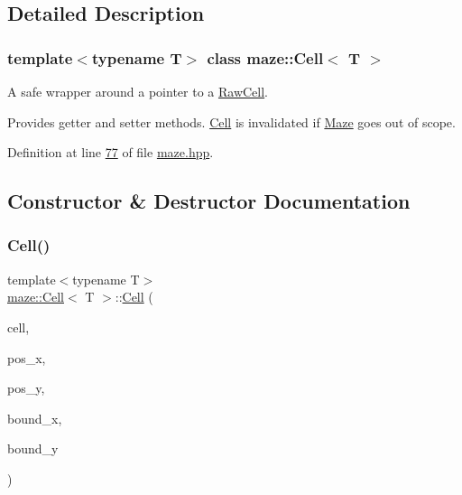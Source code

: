 \subsection{Detailed Description}
\subsubsection*{template$<$typename T$>$\newline
class maze\+::\+Cell$<$ T $>$}

A safe wrapper around a pointer to a \hyperlink{classmaze_1_1RawCell}{Raw\+Cell}. 

Provides getter and setter methods. \hyperlink{classmaze_1_1Cell}{Cell} is invalidated if \hyperlink{classmaze_1_1Maze}{Maze} goes out of scope. 

Definition at line \hyperlink{maze_8hpp_source_l00077}{77} of file \hyperlink{maze_8hpp_source}{maze.\+hpp}.



\subsection{Constructor \& Destructor Documentation}
\mbox{\label{classmaze_1_1Cell_af62f7d677daf7ccd54313843dd2297b1}} 
\subsubsection{\texorpdfstring{Cell()}{Cell()}}
{\footnotesize\ttfamily template$<$typename T$>$ \\
\hyperlink{classmaze_1_1Cell}{maze\+::\+Cell}$<$ T $>$\+::\hyperlink{classmaze_1_1Cell}{Cell} (\begin{DoxyParamCaption}\item[{\hyperlink{classmaze_1_1RawCell}{Raw\+Cell}$<$ \hyperlink{classmaze_1_1Cell_a33cfcdd0d72cc870c85e62852faaf530}{type} $>$ $\ast$}]{cell,  }\item[{\hyperlink{namespacemaze_ae8120a098fabafbbfa264a3c619640b3}{index}}]{pos\+\_\+x,  }\item[{\hyperlink{namespacemaze_ae8120a098fabafbbfa264a3c619640b3}{index}}]{pos\+\_\+y,  }\item[{\hyperlink{namespacemaze_ae8120a098fabafbbfa264a3c619640b3}{index}}]{bound\+\_\+x,  }\item[{\hyperlink{namespacemaze_ae8120a098fabafbbfa264a3c619640b3}{index}}]{bound\+\_\+y }\end{DoxyParamCaption})\hspace{0.3cm}{\ttfamily [inline]}}



